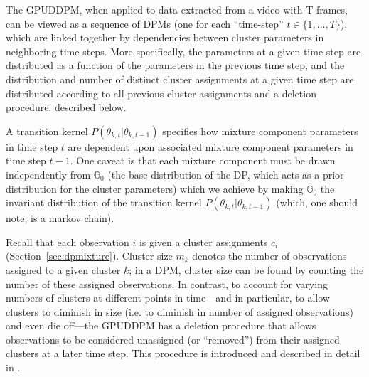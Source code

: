 \documentclass[twocolumn, final]{svjour3}
\begin{document}
The GPUDDPM, when applied to data extracted from a video with T frames, can be viewed as a sequence of DPMs (one for each ``time-step'' $t \in \{1, \ldots, T \}$), which are linked together by dependencies between cluster parameters in neighboring time steps. More specifically, the parameters at a given time step are distributed as a function of the parameters in the previous time step, and the distribution and number of distinct cluster assignments at a given time step are distributed according to all previous cluster assignments and a deletion procedure, described below.

A transition kernel $P(\theta_{k,t} | \theta_{k,t-1})$ specifies how mixture component parameters in time step $t$ are dependent upon associated mixture component parameters in time step $t-1$. One caveat is that each mixture component must be drawn independently from $\mathbb{G}_{0}$ (the base distribution of the DP, which acts as a prior distribution for the cluster parameters) which we achieve by making $\mathbb{G}_{0}$ the invariant distribution of the transition kernel $P(\theta_{k,t} | \theta_{k,t-1})$ (which, one should note, is a markov chain).

Recall that each observation $i$ is given a cluster assignments $c_{i}$ (Section~\ref{sec:dpmixture}). Cluster size $m_{k}$ denotes the number of observations assigned to a given cluster $k$; in a DPM, cluster size can be found by counting the number of these assigned observations. In contrast, to account for varying numbers of clusters at different points in time---and in particular, to allow clusters to diminish in size (i.e. to diminish in number of assigned observations) and even die off---the GPUDDPM has a deletion procedure that allows observations to be considered unassigned (or ``removed'') from their assigned clusters at a later time step. This procedure is introduced and described in detail in \cite{caron_2007}.
\end{document}
